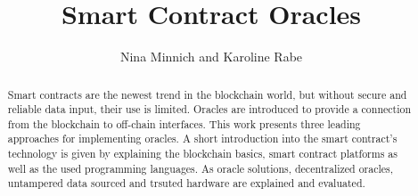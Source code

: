 \documentclass[conference]{IEEEtran}
\begin{document}
%
\title{Smart Contract Oracles}


\author{Nina Minnich and Karoline Rabe}


% 








\maketitle

\begin{abstract}
Smart contracts are the newest trend in the blockchain world, but without secure and reliable data input, their use is limited. Oracles are introduced to provide a connection from the blockchain to off-chain interfaces. This work presents three leading approaches for implementing oracles. A short introduction into the smart contract's technology is given by explaining the blockchain basics, smart contract platforms as well as the used programming languages. As oracle solutions, decentralized oracles, untampered data sourced and trsuted hardware are explained and evaluated.
\end{abstract}
\end{document}
